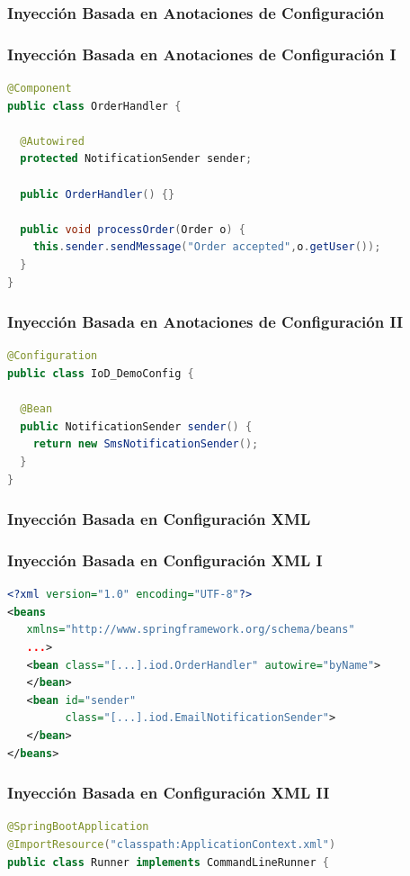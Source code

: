 \documentclass[a4paper,t,xcolor=pst,dvips,colortheme]{beamer}
\begin{document}
\subsubsection{Inyección Basada en Anotaciones de Configuración}

\begin{frame}[c,fragile]
	\frametitle{Inyección Basada en Anotaciones de Configuración I}
\begin{lstlisting}[basicstyle=\footnotesize,language=Java]
@Component
public class OrderHandler {

  @Autowired
  protected NotificationSender sender;
	
  public OrderHandler() {}
	
  public void processOrder(Order o) {
    this.sender.sendMessage("Order accepted",o.getUser());
  }
}
\end{lstlisting}
\end{frame}

\begin{frame}[c,fragile]
	\frametitle{Inyección Basada en Anotaciones de Configuración II}
\begin{lstlisting}[basicstyle=\footnotesize,language=Java]
@Configuration
public class IoD_DemoConfig {
	
  @Bean
  public NotificationSender sender() {
    return new SmsNotificationSender();
  }
}
\end{lstlisting}
\end{frame}

\subsubsection{Inyección Basada en Configuración XML}

\begin{frame}[c,fragile]
	\frametitle{Inyección Basada en Configuración XML I}
\begin{lstlisting}[basicstyle=\footnotesize,language=XML]
<?xml version="1.0" encoding="UTF-8"?>
<beans
   xmlns="http://www.springframework.org/schema/beans"
   ...>
   <bean class="[...].iod.OrderHandler" autowire="byName">
   </bean>
   <bean id="sender"
         class="[...].iod.EmailNotificationSender">
   </bean>
</beans>
\end{lstlisting}
\end{frame}

\begin{frame}[c,fragile]
	\frametitle{Inyección Basada en Configuración XML II}
\begin{lstlisting}[basicstyle=\footnotesize,language=Java]
@SpringBootApplication
@ImportResource("classpath:ApplicationContext.xml")
public class Runner implements CommandLineRunner {
\end{lstlisting}
\end{frame}
\end{document}
